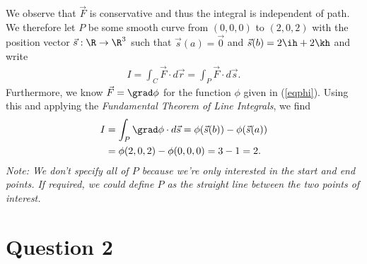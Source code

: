 \documentclass{article}
\begin{document}
We observe that $\vec F$ is conservative and thus the integral is independent of
path. We therefore let $P$ be some smooth curve from $(0,0,0)$ to $(2,0,2)$ with the
position vector $\vec s:\R\to\R^3$ such that $\vec s(a)=\vec 0$ and $\vec s(b)=2\ih + 2\kh$
and write
\begin{align*}
  I=\int_C \vec F \cdot d\vec r = \int_P \vec F \cdot d\vec s.
\end{align*}
Furthermore, we know $\vec F=\grad\phi$ for the function $\phi$ given in (\ref{eqphi}).
Using this and applying the \emph{Fundamental Theorem of Line Integrals}, we find
\begin{align*}
  I & = \int_P \grad \phi\cdot d\vec s = \phi(\vec s(b))-\phi(\vec s(a)) \\
    & = \phi(2,0,2)-\phi(0,0,0) = 3 - 1 = 2.
\end{align*}
\emph{Note: We don't specify all of $P$ because we're only interested in the start
  and end points. If required, we could define $P$ as the straight line between
  the two points of interest.}


\section*{Question 2}
\end{document}
